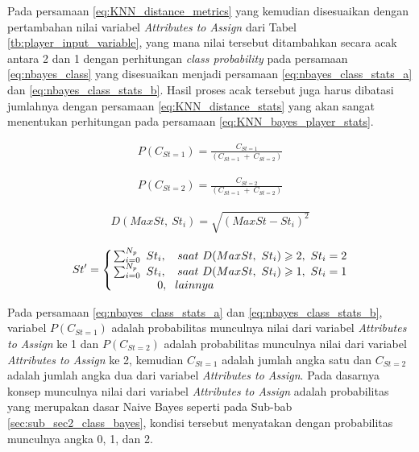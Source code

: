 Pada persamaan \ref{eq:KNN_distance_metrics} yang kemudian disesuaikan dengan pertambahan nilai variabel \textit{Attributes to Assign} dari Tabel \ref{tb:player_input_variable}, yang mana nilai tersebut ditambahkan secara acak antara 2 dan 1 dengan perhitungan \textit{class probability} pada persamaan \ref{eq:nbayes_class} yang disesuaikan menjadi persamaan \ref{eq:nbayes_class_stats_a} dan \ref{eq:nbayes_class_stats_b}. Hasil proses acak tersebut juga harus dibatasi jumlahnya dengan persamaan \ref{eq:KNN_distance_stats} yang akan sangat menentukan perhitungan pada persamaan \ref{eq:KNN_bayes_player_stats}.
\vspace{1ex}

\begin{equation}\label{eq:nbayes_class_stats_a}
\begin{split}
P(C_{St = 1}) = \frac{C_{St = 1}}{(C_{St = 1}\ +\ C_{St = 2})}
\end{split}
\end{equation}

\begin{equation}\label{eq:nbayes_class_stats_b}
\begin{split}
P(C_{St = 2}) = \frac{C_{St = 2}}{(C_{St = 1}\ +\ C_{St = 2})}
\end{split}
\end{equation}

\begin{equation}\label{eq:KNN_distance_stats}
\begin{split}
D(MaxSt,\ St_{i}) = \sqrt{(MaxSt - St_{i})^2}
\end{split}
\end{equation}

\begin{equation}\label{eq:KNN_bayes_player_stats}
\begin{split}
St' = \left\{\begin{matrix}
\sum_{i = 0}^{N_{p}}\ St_{i}, & saat\ D(MaxSt,\ St_{i}) \geqslant 2,\ St_{i} = 2 \\ 
\sum_{i = 0}^{N_{p}}\ St_{i}, & saat\ D(MaxSt,\ St_{i}) \geqslant 1,\ St_{i} = 1 \\
\hspace{4.0em} 0, 		  & \hspace{-12.0em} lainnya
\end{matrix}\right.
\end{split}
\end{equation}

Pada persamaan \ref{eq:nbayes_class_stats_a} dan \ref{eq:nbayes_class_stats_b}, variabel $P(C_{St = 1})$ adalah probabilitas munculnya nilai dari variabel \textit{Attributes to Assign} ke 1 dan $P(C_{St = 2})$ adalah probabilitas munculnya nilai dari variabel \textit{Attributes to Assign} ke 2, kemudian $C_{St = 1}$ adalah jumlah angka satu dan $C_{St = 2}$ adalah jumlah angka dua dari variabel \textit{Attributes to Assign}. Pada dasarnya konsep munculnya nilai dari variabel \textit{Attributes to Assign} adalah probabilitas yang merupakan dasar Naive Bayes seperti pada Sub-bab \ref{sec:sub_sec2_class_bayes}, kondisi tersebut menyatakan dengan probabilitas munculnya angka 0, 1, dan 2. 
\vspace{1ex}

